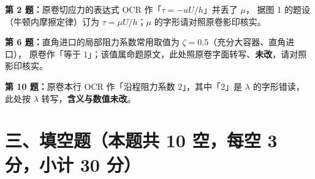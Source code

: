 \begin{tishi}
\textbf{第 2 题：}原卷切应力的表达式 OCR 作「$\tau=-u U/h$」并丢了 $\mu$，
据图 1 的题设（牛顿内摩擦定律）订为 $\tau=\mu U/h$；$\mu$ 的字形请对照原卷影印核实。

\textbf{第 6 题：}直角进口的局部阻力系数常用取值为 $\zeta=0.5$（充分大容器、直角进口），
原卷作「等于 $1$」；该值属命题原文，此处照原卷字面转写、\textbf{未改}，请对照影印核实。

\textbf{第 10 题：}原卷本行 OCR 作「沿程阻力系数 $2$」，其中「$2$」是 $\lambda$ 的字形错读，
此处按 $\lambda$ 转写，\textbf{含义与数值未改}。
\end{tishi}

\section{三、填空题（本题共 10 空，每空 3 分，小计 30 分）}

